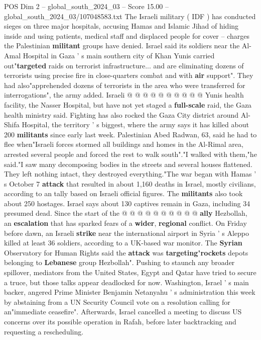 \begin{textsample}{POS Dim 2 – global\_south\_2024\_03 – Score 15.00 – global\_south\_2024\_03/107048583.txt}
The Israeli military ( IDF ) has conducted sieges on three major hospitals, accusing Hamas and Islamic Jihad of hiding inside and using patients, medical staff and displaced people for cover -- charges the Palestinian \textbf{militant} groups have denied.
Israel said its soldiers near the Al-Amal Hospital in Gaza ' s main southern city of Khan Yunis carried out"\textbf{targeted} raids on terrorist infrastructure... and are eliminating dozens of terrorists using precise fire in close-quarters combat and with \textbf{air} support".
They had also"apprehended dozens of terrorists in the area who were transferred for interrogations", the army added.
Israeli @ @ @ @ @ @ @ @ @ @ Yunis health facility, the Nasser Hospital, but have not yet staged a \textbf{full-scale} raid, the Gaza health ministry said.
Fighting has also rocked the Gaza City district around Al-Shifa Hospital, the territory ' s biggest, where the army says it has killed about 200 \textbf{militants} since early last week.
Palestinian Abed Radwan, 63, said he had to flee when"Israeli forces stormed all buildings and homes in the Al-Rimal area, arrested several people and forced the rest to walk south"."I walked with them,"he said."I saw many decomposing bodies in the streets and several houses flattened.
They left nothing intact, they destroyed everything."The war began with Hamas ' s October 7 \textbf{attack} that resulted in about 1,160 deaths in Israel, mostly civilians, according to an tally based on Israeli official figures.
The \textbf{militants} also took about 250 hostages.
Israel says about 130 captives remain in Gaza, including 34 presumed dead.
Since the start of the @ @ @ @ @ @ @ @ @ @ \textbf{ally} Hezbollah, an \textbf{escalation} that has sparked fears of a \textbf{wider}, \textbf{regional} conflict.
On Friday before dawn, an Israeli \textbf{strike} near the international airport in Syria ' s Aleppo killed at least 36 soldiers, according to a UK-based war monitor.
The \textbf{Syrian} Observatory for Human Rights said the \textbf{attack} was \textbf{targeting}"\textbf{rockets} depots belonging to \textbf{Lebanese} group Hezbollah".
Pushing to staunch any broader spillover, mediators from the United States, Egypt and Qatar have tried to secure a truce, but those talks appear deadlocked for now.
Washington, Israel ' s main backer, angered Prime Minister Benjamin Netanyahu ' s administration this week by abstaining from a UN Security Council vote on a resolution calling for an"immediate ceasefire".
Afterwards, Israel cancelled a meeting to discuss US concerns over its possible operation in Rafah, before later backtracking and requesting a rescheduling.

\end{textsample}
